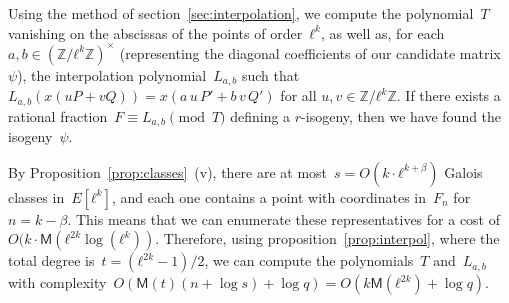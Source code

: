 \documentclass{lms}
\def\cout#1{\mathsf{#1}}
\newcommand{\MM}{\cout{M}}
\begin{document}
Using the method of section~\ref{sec:interpolation},
we compute the polynomial~$T$ vanishing on the abscissas of
the points of order~$ℓ^k$,
as well as, for each $a, b ∈ (ℤ/ℓ^k ℤ)^×$
(representing the diagonal coefficients of our candidate matrix $ψ$),
the interpolation polynomial~$L_{a,b}$
such that $L_{a,b} (x (u P + v Q)) = x(a\, u\,P' + b\,v\, Q')$
for all $u, v ∈ ℤ/ℓ^k ℤ$.
If there exists a rational fraction~$F ≡ L_{a,b} \pmod{T}$
defining a $r$-isogeny,
then we have found the isogeny~$ψ$.

By Proposition~\ref{prop:classes}~(v),
there are at most~$s = O(k· ℓ^{k+β})$ Galois classes in~$E[ℓ^k]$,
and each one contains a point with coordinates in~$F_n$ for~$n = k-β$.
This means that we can enumerate these representatives for a cost
of~$O(k · \MM(ℓ^{2k} \log(ℓ^k))$.
Therefore, using proposition~\ref{prop:interpol},
where the total degree is~$t = (ℓ^{2k}-1)/2$,
we can compute the polynomials~$T$ and~$L_{a,b}$ with
complexity~$O(\MM(t) (n + \log s) + \log q)
= O(k \MM(ℓ^{2k}) + \log q)$.
\end{document}
